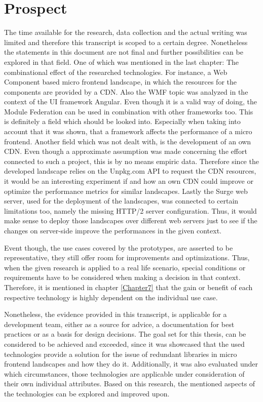\chapter{Prospect} %
\label{Chapter9}


The time available for the research, data collection and the actual writing was limited and therefore this transcript is scoped to a certain degree. Nonetheless the statements in this document are not final and further possibilities can be explored in that field. One of which was mentioned in the last chapter: The combinational effect of the researched technologies. For instance, a Web Component based micro frontend landscape, in which the resources for the components are provided by a CDN. Also the WMF topic was analyzed in the context of the UI framework Angular. Even though it is a valid way of doing, the Module Federation can be used in combination with other frameworks too. This is definitely a field which should be looked into. Especially when taking into account that it was shown, that a framework affects the performance of a micro frontend. 
Another field which was not dealt with, is the development of an own CDN. Even though a approximate assumption was made concerning the effort connected to such a project, this is by no means empiric data. Therefore since the developed landscape relies on the Unpkg.com API to request the CDN resources, it would be an interesting experiment if and how an own CDN could improve or optimize the performance metrics for similar landscapes.
Lastly the Surge web server, used for the deployment of the landscapes, was connected to certain limitations too, namely the missing HTTP/2 server configuration. Thus, it would make sense to deploy those landscapes over different web servers just to see if the changes on server-side improve the performances in the given context.

Event though, the use cases covered by the prototypes, are asserted to be representative, they still offer room for improvements and optimizations. Thus, when the given research is applied to a real life scenario, special conditions or requirements have to be considered when making a decision in that context. Therefore, it is mentioned in chapter \ref{Chapter7} that the gain or benefit of each respective technology is highly dependent on the individual use case. 

Nonetheless, the evidence provided in this transcript, is applicable for a development team, either as a source for advice, a documentation for best practices or as a basis for design decisions. The goal set for this thesis, can be considered to be achieved and exceeded, since it was showcased that the used technologies provide a solution for the issue of redundant libraries in micro frontend landscapes and how they do it. Additionally, it was also evaluated under which circumstances, those technologies are applicable under consideration of their own individual attributes. Based on this research, the mentioned aspects of the technologies can be explored and improved upon.




